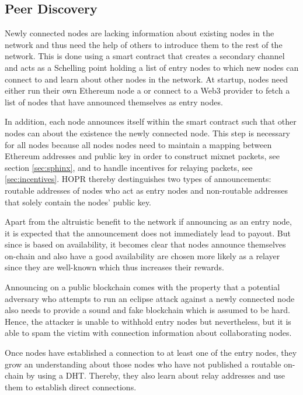 \subsection{Peer Discovery}
\label{sec:p2p:peer-discovery}

Newly connected nodes are lacking information about existing nodes in the network and thus need the help of others to introduce them to the rest of the network. This is done using a smart contract that creates a secondary channel and acts as a Schelling point holding a list of entry nodes to which new nodes can connect to and learn about other nodes in the network. At startup, nodes need either run their own Ethereum node a or connect to a Web3 provider to fetch a list of nodes that have announced themselves as entry nodes.

In addition, each node announces itself within the smart contract such that other nodes can about the existence the newly connected node. This step is necessary for all nodes because all nodes nodes need to maintain a mapping between Ethereum addresses and public key in order to construct mixnet packets, see section \ref{sec:sphinx}, and to handle incentives for relaying packets, see \ref{sec:incentives}. HOPR thereby destinguishes two types of announcements: routable addresses of nodes who act as entry nodes and non-routable addresses that solely contain the nodes' public key.

Apart from the altruistic benefit to the network if announcing as an entry node, it is expected that the announcement does not immediately lead to payout. But since  is based on availability, it becomes clear that nodes announce themselves on-chain and also have a good availability are chosen more likely as a relayer since they are well-known which thus increases their rewards.

Announcing on a public blockchain comes with the property that a potential adversary who attempts to run an eclipse attack against a newly connected node also needs to provide a sound and fake blockchain which is assumed to be hard. Hence, the attacker is unable to withhold entry nodes but nevertheless, but it is able to spam the victim with connection information about collaborating nodes.

Once nodes have established a connection to at least one of the entry nodes, they grow an understanding about those nodes who have not published a routable on-chain by using a DHT. Thereby, they also learn about relay addresses and use them to establish direct connections.